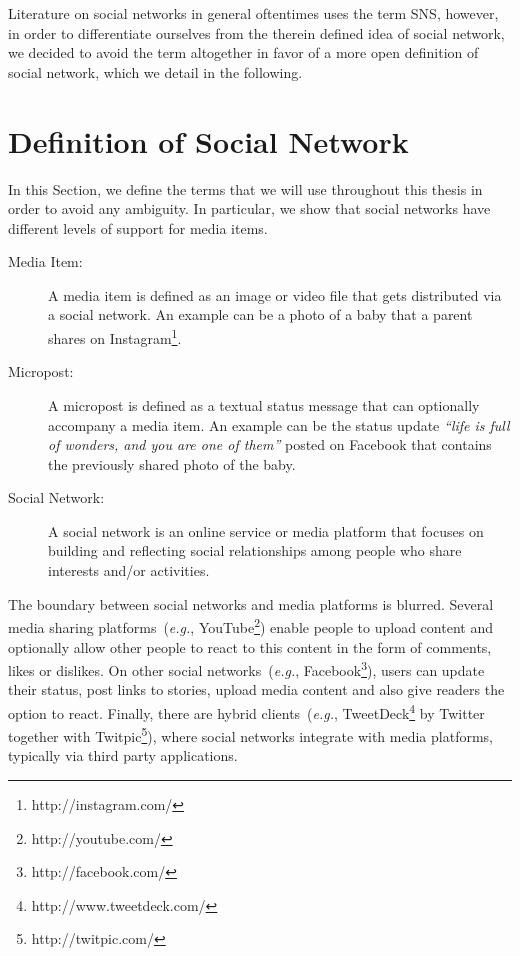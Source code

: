 Literature on social networks in general oftentimes uses the term SNS,
however, in order to differentiate ourselves from the therein defined idea of social network,
we decided to avoid the term altogether in favor of a more open definition of social network,
which we detail in the following. 

\section{Definition of Social Network} \label{sec:definition}
In this Section, we define the terms that we will use throughout this thesis
in order to avoid any ambiguity.
In particular, we show that social networks have
different levels of support for media items.

\begin{description}
  \item[Media Item:] A media item is defined as an image or video file
that gets distributed via a social network.
An example can be a photo of a baby that
a parent shares on Instagram\footnote{http://instagram.com/}.

  \item[Micropost:]
A micropost is defined as a textual status message that can optionally accompany a media item.
An example can be the status update
\emph{``life is full of wonders, and you are one of them''}
posted on Facebook that contains the previously shared photo of the baby.

  \item[Social Network:]
A social network is an online service or media platform
that focuses on building and reflecting social relationships among
people who share interests and/or activities.
\end{description}

The boundary between social networks and media platforms is blurred.
Several media sharing platforms~(\emph{e.g.}, YouTube\footnote{http://youtube.com/})
enable people to upload content and optionally allow other people to react
to this content in the form of comments, likes or dislikes.
On other social networks~(\emph{e.g.}, Facebook\footnote{http://facebook.com/}),
users can update their status, post links to stories, upload media content
and also give readers the option to react.
Finally, there are hybrid clients~(\emph{e.g.}, TweetDeck\footnote{http://www.tweetdeck.com/}
by Twitter together with Twitpic\footnote{http://twitpic.com/}), where social networks integrate with media platforms, typically via third party applications.

